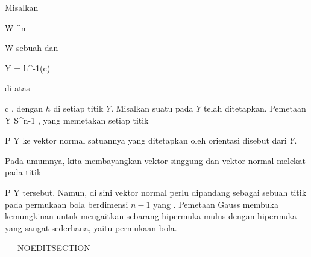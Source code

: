 
{}
{

Misalkan

\mavergleichskette
{\vergleichskette
{ W
}
{ \subseteq }{ \R^n
}
{  }{
}
{    }{
}
{   }{
}
}
{}{}{}

 { W } { \R
} {}
sebuah
dan

\mavergleichskette
{\vergleichskette
{ Y
}
{ = }{ h^{-1}(c)
}
{  }{
}
{    }{
}
{   }{
}
}
{}{}{}

di atas

\mavergleichskette
{\vergleichskette
{ c
}
{ \in }{ \R
}
{  }{
}
{    }{
}
{   }{
}
}
{}{}{,}
dengan $h$
di setiap titik $Y$. Misalkan suatu
pada $Y$ telah ditetapkan. Pemetaan
\maabbdisp {} { Y } { S^{n-1}
} {,}
yang memetakan setiap titik

\mavergleichskette
{\vergleichskette
{ P
}
{ \in }{ Y
}
{  }{
}
{    }{
}
{   }{
}
}
{}{}{}
ke vektor normal satuannya yang ditetapkan oleh orientasi disebut
dari $Y$.

}

Pada umumnya, kita membayangkan vektor singgung dan vektor normal melekat pada titik

\mavergleichskette
{\vergleichskette
{ P
}
{ \in }{ Y
}
{  }{
}
{    }{
}
{   }{
}
}
{}{}{}
tersebut. Namun, di sini vektor normal perlu dipandang sebagai sebuah titik pada permukaan bola berdimensi $n-1$ yang . Pemetaan Gauss membuka kemungkinan untuk mengaitkan sebarang hipermuka mulus dengan hipermuka yang sangat sederhana, yaitu permukaan bola.

__NOEDITSECTION__

